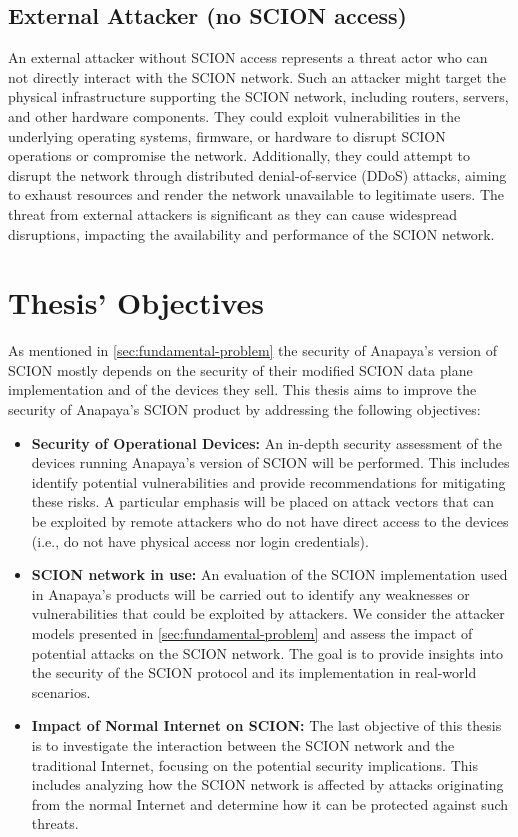 \subsection{External Attacker (no SCION access)}
An external attacker without SCION access represents a threat actor who can not directly interact with the SCION network.
Such an attacker might target the physical infrastructure supporting the SCION network, including routers, servers, and other hardware components.
They could exploit vulnerabilities in the underlying operating systems, firmware, or hardware to disrupt SCION operations or compromise the network.
Additionally, they could attempt to disrupt the network through distributed denial-of-service (DDoS) attacks, aiming to exhaust resources and render the network unavailable to legitimate users.
The threat from external attackers is significant as they can cause widespread disruptions, impacting the availability and performance of the SCION network.



\section{Thesis' Objectives}
As mentioned in \cref{sec:fundamental-problem} the security of Anapaya's version of SCION mostly depends on the security of their modified SCION data plane implementation and of the devices they sell.
This thesis aims to improve the security of Anapaya's SCION product by addressing the following objectives:

\begin{itemize}
        \item \textbf{Security of Operational Devices:}
        An in-depth security assessment of the devices running Anapaya's version of SCION will be performed.
        This includes identify potential vulnerabilities and provide recommendations for mitigating these risks.
        A particular emphasis will be placed on attack vectors that can be exploited by remote attackers who do not have direct access to the devices (i.e., do not have physical access nor login credentials).

        \item \textbf{SCION network in use:}
        An evaluation of the SCION implementation used in Anapaya's products will be carried out to identify any weaknesses or vulnerabilities that could be exploited by attackers.
        We consider the attacker models presented in \cref{sec:fundamental-problem} and assess the impact of potential attacks on the SCION network.
        The goal is to provide insights into the security of the SCION protocol and its implementation in real-world scenarios.

        \item \textbf{Impact of Normal Internet on SCION:}
        The last objective of this thesis is to investigate the interaction between the SCION network and the traditional Internet, focusing on the potential security implications.
        This includes analyzing how the SCION network is affected by attacks originating from the normal Internet and determine how it can be protected against such threats.
\end{itemize}



